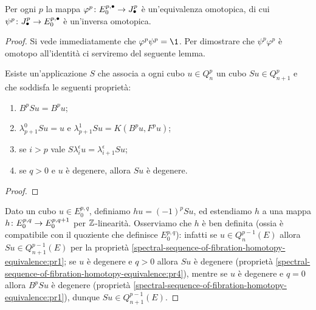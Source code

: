 \begin{proposition}
Per ogni $p$ la mappa $\varphi^p\colon E^{p,\bullet}_0\to J^p_\bullet$ è un'equivalenza omotopica, di cui $\psi^p\colon J^p_\bullet\to E^{p,\bullet}_0$ è un'inversa omotopica.
\end{proposition}
\begin{proof}
Si vede immediatamente che $\varphi^p\psi^p=\1$. Per dimostrare che $\psi^p\varphi^p$ è omotopo all'identità ci serviremo del seguente lemma.
\begin{lemma}
Esiste un'applicazione $S$  che associa a ogni cubo $u\in Q^p_n$ un cubo $Su\in Q^p_{n+1}$ e che soddisfa le seguenti proprietà:
\begin{enumerate}
\item\label{spectral-sequence-of-fibration-homotopy-equivalence:pr1} $B^pSu=B^pu$;
\item\label{spectral-sequence-of-fibration-homotopy-equivalence:pr2} $\lambda^0_{p+1}Su=u$ e $\lambda^1_{p+1}Su=K(B^pu,F^pu)$;
\item\label{spectral-sequence-of-fibration-homotopy-equivalence:pr3} se $i>p$ vale $S\lambda^\epsilon_iu=\lambda^\epsilon_{i+1}Su$;
\item\label{spectral-sequence-of-fibration-homotopy-equivalence:pr4} se $q>0$ e $u$ è degenere, allora $Su$ è degenere.
\end{enumerate}
\end{lemma}
\begin{proof}

\end{proof}
Dato un cubo $u\in E^{p,q}_0$, definiamo $hu=(-1)^pSu$, ed estendiamo $h$ a una mappa
$h\colon E^{p,q}_0\to E^{p,q+1}_0$ per $\mathbb{Z}$-linearità. Osserviamo che $h$ è ben definita (ossia è compatibile con il quoziente che definisce $E^{p,q}_0$): infatti se $u\in Q^{p-1}_n(E)$ allora $Su\in Q^{p-1}_{n+1}(E)$ per la proprietà \ref{spectral-sequence-of-fibration-homotopy-equivalence:pr1}; se $u$ è degenere e $q>0$ allora $Su$ è degenere (proprietà \ref{spectral-sequence-of-fibration-homotopy-equivalence:pr4}), mentre se $u$ è degenere e $q=0$ allora $B^pSu$ è degenere (proprietà \ref{spectral-sequence-of-fibration-homotopy-equivalence:pr1}), dunque $Su\in Q^{p-1}_{n+1}(E)$.


\end{proof}
